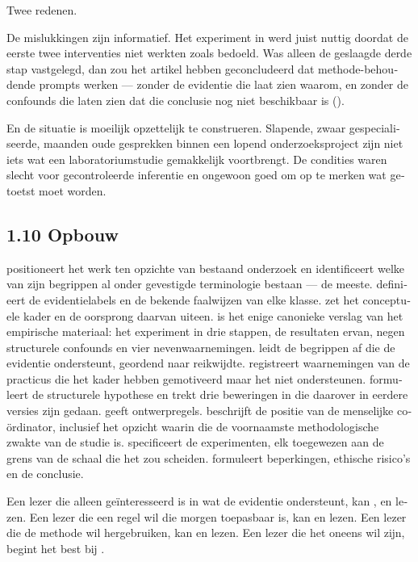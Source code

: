 \begin{dutch}
Twee redenen.

De mislukkingen zijn informatief. Het experiment in  werd juist nuttig doordat de eerste twee interventies niet werkten zoals bedoeld. Was alleen de geslaagde derde stap vastgelegd, dan zou het artikel hebben geconcludeerd dat methode-behoudende prompts werken — zonder de evidentie die laat zien waarom, en zonder de confounds die laten zien dat die conclusie nog niet beschikbaar is ().

En de situatie is moeilijk opzettelijk te construeren. Slapende, zwaar gespecialiseerde, maanden oude gesprekken binnen een lopend onderzoeksproject zijn niet iets wat een laboratoriumstudie gemakkelijk voortbrengt. De condities waren slecht voor gecontroleerde inferentie en ongewoon goed om op te merken wat getoetst moet worden.


\subsection*{1.10 Opbouw}
\label{sec:nl:1.10}

\textbf{} positioneert het werk ten opzichte van bestaand onderzoek en identificeert welke van zijn begrippen al onder gevestigde terminologie bestaan — de meeste. \textbf{} definieert de evidentielabels en de bekende faalwijzen van elke klasse. \textbf{} zet het conceptuele kader en de oorsprong daarvan uiteen. \textbf{} is het enige canonieke verslag van het empirische materiaal: het experiment in drie stappen, de resultaten ervan, negen structurele confounds en vier nevenwaarnemingen. \textbf{} leidt de begrippen af die de evidentie ondersteunt, geordend naar reikwijdte. \textbf{} registreert waarnemingen van de practicus die het kader hebben gemotiveerd maar het niet ondersteunen. \textbf{} formuleert de structurele hypothese en trekt drie beweringen in die daarover in eerdere versies zijn gedaan. \textbf{} geeft ontwerpregels. \textbf{} beschrijft de positie van de menselijke coördinator, inclusief het opzicht waarin die de voornaamste methodologische zwakte van de studie is. \textbf{} specificeert de experimenten, elk toegewezen aan de grens van de schaal die het zou scheiden. \textbf{} formuleert beperkingen, ethische risico's en de conclusie.

Een lezer die alleen geïnteresseerd is in wat de evidentie ondersteunt, kan ,  en  lezen. Een lezer die een regel wil die morgen toepasbaar is, kan  en  lezen. Een lezer die de methode wil hergebruiken, kan  en  lezen. Een lezer die het oneens wil zijn, begint het best bij .



\end{dutch}
